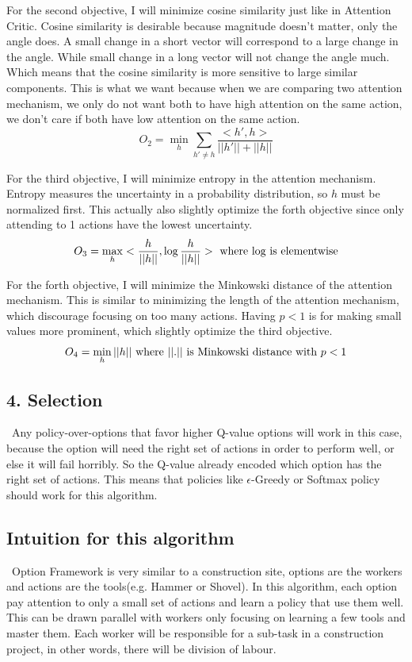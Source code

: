 \documentclass{article}
\begin{document}
	\quad For the second objective, I will minimize cosine similarity just like in Attention Critic. Cosine similarity is desirable because magnitude doesn't matter, only the angle does. A small change in a short vector will correspond to a large change in the angle. While small change in a long vector will not change the angle much. Which means that the cosine similarity is more sensitive to large similar components. This is what we want because when we are comparing two attention mechanism, we only do not want both to have high attention on the same action, we don't care if both have low attention on the same action.$$O_2 = \min_h \sum_{h' \neq h} \frac{<h', h>}{||h'||+||h||}$$
	
	\quad For the third objective, I will minimize entropy in the attention mechanism. Entropy measures the uncertainty in a probability distribution, so $h$ must be normalized first. This actually also slightly optimize the forth objective since only attending to 1 actions have the lowest uncertainty.$$O_3 = \max_h <\frac{h}{||h||},\log \frac{h}{||h||}> \textnormal{ where log is elementwise}$$
	
	\quad For the forth objective, I will minimize the Minkowski distance of the attention mechanism. This is similar to minimizing the length of the attention mechanism, which discourage focusing on too many actions. Having $p<1$ is for making small values more prominent, which slightly optimize the third objective.$$O_4 = \min_h ||h|| \textnormal{ where }||.||\textnormal{ is Minkowski distance with } p<1$$
	
	\subsection*{4. Selection}
	\qquad \ Any policy-over-options that favor higher Q-value options will work in this case, because the option will need the right set of actions in order to perform well, or else it will fail horribly. So the Q-value already encoded which option has the right set of actions. This means that policies like $\epsilon$-Greedy or Softmax policy should work for this algorithm.
	
	\subsection*{Intuition for this algorithm}
	\qquad \ Option Framework is very similar to a construction site, options are the workers and actions are the tools(e.g. Hammer or Shovel). In this algorithm, each option pay attention to only a small set of actions and learn a policy that use them well. This can be drawn parallel with workers only focusing on learning a few tools and master them. Each worker will be responsible for a sub-task in a construction project, in other words, there will be division of labour. 
	
\end{document}
